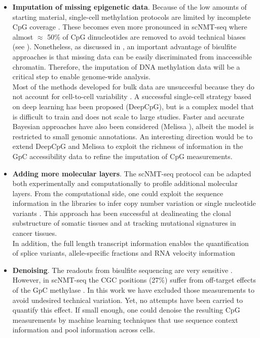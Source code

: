 \begin{itemize}
	\item \textbf{Imputation of missing epigenetic data}. Because of the low amounts of starting material, single-cell methylation protocols are limited by incomplete CpG coverage \cite{Angermueller2017}. These becomes even more pronounced in scNMT-seq where almost $\approx$ 50\% of CpG dinucleotides are removed to avoid technical biases (see ). Nonetheless, as discussed in , an important advantage of bisulfite approaches is that missing data can be easily discriminated from inaccessible chromatin. Therefore, the imputation of DNA methylation data will be a critical step to enable genome-wide analysis.\\
	Most of the methods developed for bulk data are unsuccesful because they do not account for cell-to-cell variability \cite{Angermueller2017}. A successful single-cell strategy based on deep learning has been proposed (DeepCpG\cite{Angermueller2017}), but is a complex model that is difficult to train and does not scale to large studies. Faster and accurate Bayesian approaches have also been considered (Melissa \cite{Kapourani2018b}), albeit the model is restricted to small genomic annotations. An interesting direction would be to extend DeepCpG and Melissa to exploit the richness of information in the GpC accessibility data to refine the imputation of CpG measurements.

	\item \textbf{Adding more molecular layers}. The scNMT-seq protocol can be adapted both experimentally and computationally to profile additional molecular layers. From the computational side, one could exploit the sequence information in the libraries to infer copy number variation or single nucleotide variants \cite{Poirion2018,Fan2018,McCarthy2018,Enge2017}. This approach has been successful at dealineating the clonal substructure of somatic tissues and at tracking mutational signatures in cancer tissues.\\
	In addition, the full length transcript information enables the quantification of splice variants\cite{Huang2017}, allele-specific fractions\cite{Deng2014} and RNA velocity information \cite{LaManno2018}


	\item \textbf{Denoising}. The readouts from bisulfite sequencing are very sensitive \cite{XX}. However, in scNMT-seq the CGC positions (27\%) suffer from off-target effects of the GpC methylase \cite{Kelly2012}. In this work we have excluded those measurements to avoid undesired technical variation. Yet, no attempts have been carried to quantify this effect. If small enough, one could denoise the resulting CpG measurements by machine learning techniques that use sequence context information and pool information across cells.


\end{itemize}
